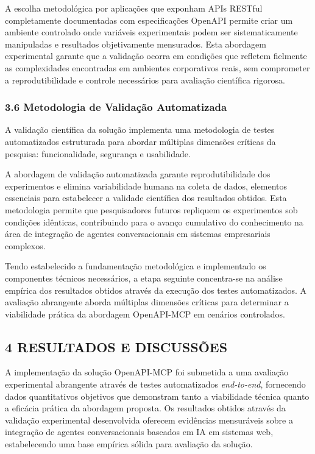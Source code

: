 \documentclass[
]{article}
\begin{document}
A escolha metodológica por aplicações que exponham APIs RESTful
completamente documentadas com especificações OpenAPI permite criar um
ambiente controlado onde variáveis experimentais podem ser
sistematicamente manipuladas e resultados objetivamente mensurados. Esta
abordagem experimental garante que a validação ocorra em condições que
refletem fielmente as complexidades encontradas em ambientes
corporativos reais, sem comprometer a reprodutibilidade e controle
necessários para avaliação científica rigorosa.

\subsubsection{3.6 Metodologia de Validação
Automatizada}\label{metodologia-de-validauxe7uxe3o-automatizada}

A validação científica da solução implementa uma metodologia de testes
automatizados estruturada para abordar múltiplas dimensões críticas da
pesquisa: funcionalidade, segurança e usabilidade.

A abordagem de validação automatizada garante reprodutibilidade dos
experimentos e elimina variabilidade humana na coleta de dados,
elementos essenciais para estabelecer a validade científica dos
resultados obtidos. Esta metodologia permite que pesquisadores futuros
repliquem os experimentos sob condições idênticas, contribuindo para o
avanço cumulativo do conhecimento na área de integração de agentes
conversacionais em sistemas empresariais complexos.

Tendo estabelecido a fundamentação metodológica e implementado os
componentes técnicos necessários, a etapa seguinte concentra-se na
análise empírica dos resultados obtidos através da execução dos testes
automatizados. A avaliação abrangente aborda múltiplas dimensões
críticas para determinar a viabilidade prática da abordagem OpenAPI-MCP
em cenários controlados.

\subsection{4 RESULTADOS E DISCUSSÕES}\label{resultados-e-discussuxf5es}

A implementação da solução OpenAPI-MCP foi submetida a uma avaliação
experimental abrangente através de testes automatizados
\emph{end-to-end}, fornecendo dados quantitativos objetivos que
demonstram tanto a viabilidade técnica quanto a eficácia prática da
abordagem proposta. Os resultados obtidos através da validação
experimental desenvolvida oferecem evidências mensuráveis sobre a
integração de agentes conversacionais baseados em IA em sistemas web,
estabelecendo uma base empírica sólida para avaliação da solução.
\end{document}
